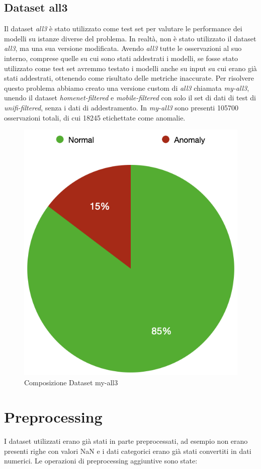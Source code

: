 \subsection{Dataset all3}
Il dataset \textit{all3} \`e stato utilizzato come test set per valutare le performance dei modelli su istanze diverse del problema. In realtà, non \`e stato utilizzato il dataset \textit{all3}, ma una sua versione modificata. Avendo \textit{all3} tutte le osservazioni al suo interno, comprese quelle su cui sono stati addestrati i modelli, se fosse stato utilizzato come test set avremmo testato i modelli anche su input su cui erano gi\`a stati addestrati, ottenendo come risultato delle metriche inaccurate. Per risolvere questo problema abbiamo creato una versione custom di \textit{all3} chiamata \textit{my-all3}, unendo il dataset \textit{homenet-filtered} e \textit{mobile-filtered} con solo il set di dati di test di \textit{unifi-filtered}, senza i dati di addestramento.
In \textit{my-all3} sono presenti 105700 osservazioni totali, di cui 18245 etichettate come anomalie.

\begin{figure}[H]
    \centering
    \includegraphics[width=0.5\linewidth]{balance_myall3.png}
    \caption{Composizione Dataset my-all3}
    \label{fig:enter-label}
\end{figure}



\section{Preprocessing}
I dataset utilizzati erano gi\`a stati in parte preprocessati, ad esempio non erano presenti righe con valori NaN e i dati categorici erano gi\`a stati convertiti in dati numerici.
Le operazioni di preprocessing aggiuntive sono state:

